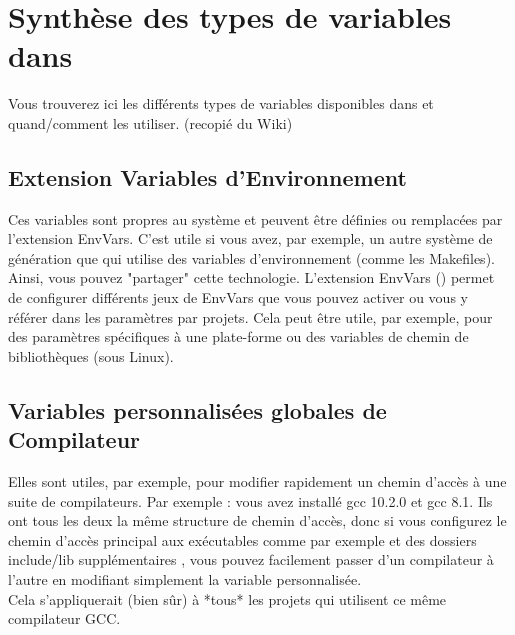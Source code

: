 \section{Synthèse des types de variables dans \codeblocks}\label{sec:cb_variables_types}

Vous trouverez ici les différents types de variables disponibles dans \codeblocks et quand/comment les utiliser. (recopié du Wiki)

\subsection{Extension Variables d'Environnement}

Ces variables sont propres au système et peuvent être définies ou remplacées par l'extension EnvVars.
C'est utile si vous avez, par exemple, un autre système de génération que \codeblocks qui utilise des variables d'environnement (comme les Makefiles). Ainsi, vous pouvez "partager" cette technologie.
L'extension EnvVars () permet de configurer différents jeux de EnvVars que vous pouvez activer ou vous y référer dans les paramètres par projets.
Cela peut être utile, par exemple, pour des paramètres spécifiques à une plate-forme ou des variables de chemin de bibliothèques (sous Linux). 

\subsection{Variables personnalisées globales de Compilateur}

Elles sont utiles, par exemple, pour modifier rapidement un chemin d'accès à une suite de compilateurs.
Par exemple : vous avez installé gcc 10.2.0 et gcc 8.1. Ils ont tous les deux la même structure de chemin d'accès, donc si vous configurez le chemin d'accès principal aux exécutables comme par exemple  
et des dossiers include/lib supplémentaires , vous pouvez facilement passer d'un compilateur à l'autre en modifiant simplement la variable personnalisée. \\
Cela s'appliquerait (bien sûr) à *tous* les projets qui utilisent ce même compilateur GCC.

